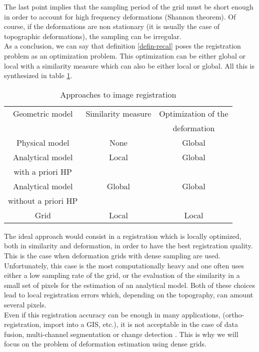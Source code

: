 The last point implies that the sampling period of the grid must be short
enough in order to account for high frequency deformations (Shannon
theorem). Of course, if the deformations are non stationary (it is
usually the case of topographic deformations), the sampling can 
be irregular.\\

As a conclusion, we can say that definition \ref{defin-recal} poses
the registration problem as an optimization problem. This optimization
can be either global or local with a similarity measure which can also
be either local or global. All this is synthesized in table  \ref{tab-approches}.\\

\begin{table}[b]
\begin{center}
\begin{tabular}{|c|c|c|}
\hline
Geometric model & Similarity measure & Optimization of the \\
& & deformation \\
\hline
Physical model & None & Global \\
\hline
Analytical model  & Local & Global \\
with a priori HP & & \\
\hline
Analytical model& Global & Global \\
without a priori HP & & \\
\hline
Grid & Local & Local \\
\hline
\end{tabular}
\end{center}
\caption{Approaches to image registration}
\label{tab-approches}
\end{table}

The ideal approach would consist in a registration which is locally
optimized, both in similarity and deformation, in order to have the
best registration quality. This is the case when deformation grids with
dense sampling are used. Unfortunately, this case is the most
computationally heavy and one often uses either a low sampling rate of
the grid, or the evaluation of the similarity in a small set of pixels
for the estimation of an analytical model. Both of these choices lead to local registration
errors which, depending on the topography, can amount several
pixels.\\

Even if this registration accuracy can be enough in many
applications, (ortho-registration, import into a GIS, etc.), it is not
acceptable in the case of data fusion, multi-channel segmentation or
change detection \cite{townshend}. This is why we will focus on the
problem of deformation estimation using dense grids.\\

